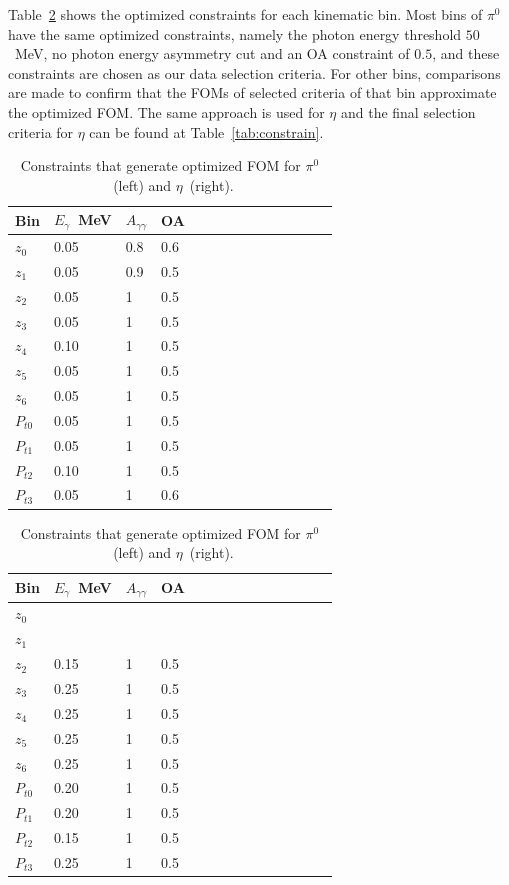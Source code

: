 Table~\ref{tab:FOM} shows the optimized constraints for each kinematic bin. Most bins of $\pi^0$ have the same optimized constraints, namely the photon energy threshold $50$~MeV, no photon energy asymmetry cut and an OA constraint of $0.5$, and these constraints are chosen as our data selection criteria. For other bins, comparisons are made to confirm that the FOMs of selected criteria of that bin approximate the optimized FOM. The same approach is used for $\eta$ and the final selection criteria for $\eta$ can be found at Table~\ref{tab:constrain}.%
\begin{table}[H]
\begin{tabular}{|p{1.3cm}|l|l|l|l|l|l|l|l|l|l|l|l|l|}
\hline
Bin & $E_{\gamma}$~MeV & $A_{\gamma\gamma}$ & OA \\ \hline
$z_0$ & 0.05 & 0.8 & 0.6 \\\hline
$z_1$ & 0.05 & 0.9 & 0.5 \\\hline
$z_2$ & 0.05 & 1 & 0.5 \\\hline
$z_3$ & 0.05 & 1 & 0.5 \\\hline
$z_4$ & 0.10 & 1 & 0.5 \\\hline
$z_5$ & 0.05 & 1 & 0.5 \\\hline
$z_6$ & 0.05 & 1 & 0.5 \\\hline
$P_{t0}$ & 0.05 & 1 & 0.5 \\\hline
$P_{t1}$ & 0.05 & 1 & 0.5 \\\hline
$P_{t2}$ & 0.10 & 1 & 0.5 \\\hline
$P_{t3}$ & 0.05 & 1 & 0.6 \\\hline
\end{tabular}
\quad
\begin{tabular}{|p{1.3cm}|l|l|l|l|l|l|l|l|l|l|l|l|l|}
\hline
Bin & $E_{\gamma}$~MeV & $A_{\gamma\gamma}$ & OA \\ \hline
$z_0$ &  &  &  \\\hline
$z_1$ &  &  &  \\\hline
$z_2$ & 0.15 & 1 & 0.5 \\\hline
$z_3$ & 0.25 & 1 & 0.5 \\\hline
$z_4$ & 0.25 & 1 & 0.5 \\\hline
$z_5$ & 0.25 & 1 & 0.5 \\\hline
$z_6$ & 0.25 & 1 & 0.5 \\\hline
$P_{t0}$ & 0.20 & 1 & 0.5 \\\hline
$P_{t1}$ & 0.20 & 1 & 0.5 \\\hline
$P_{t2}$ & 0.15 & 1 & 0.5 \\\hline
$P_{t3}$ & 0.25 & 1 & 0.5 \\\hline
\end{tabular}
\caption{Constraints that generate optimized FOM for $\pi^0$~(left) and $\eta$~(right).}
\label{tab:FOM}
\end{table}

